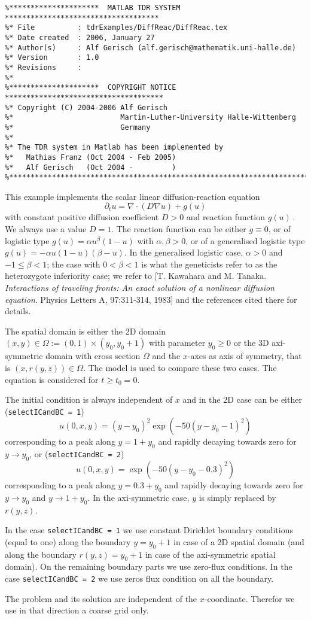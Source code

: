 \documentclass{article}
\begin{document}
\begin{verbatim}
%*********************  MATLAB TDR SYSTEM  ************************************
%* File          : tdrExamples/DiffReac/DiffReac.tex
%* Date created  : 2006, January 27
%* Author(s)     : Alf Gerisch (alf.gerisch@mathematik.uni-halle.de)
%* Version       : 1.0
%* Revisions     : 
%*
%*********************  COPYRIGHT NOTICE  *************************************
%* Copyright (C) 2004-2006 Alf Gerisch
%*                         Martin-Luther-University Halle-Wittenberg
%*                         Germany
%*
%* The TDR system in Matlab has been implemented by
%*   Mathias Franz (Oct 2004 - Feb 2005)
%*   Alf Gerisch   (Oct 2004 -         )
%******************************************************************************
\end{verbatim}


This example implements the scalar linear diffusion-reaction equation
\[
\partial_t u = \nabla\cdot(D \nabla u) + g(u)
\]
with constant positive diffusion coefficient $D>0$ and reaction function
$g(u)$\,.
We always use a value $D=1$.
The reaction function can be either $g\equiv 0$, or of logistic type
$g(u)=\alpha u^\beta (1-u)$ with $\alpha,\beta>0$,
or of a generalised logistic type $g(u)=-\alpha u (1-u)(\beta -u)$.
In the generalised logistic case, $\alpha>0$ and $-1\le \beta < 1$; the case
with $0< \beta < 1$ is what the geneticists refer to as the heterozygote
inferiority case; we refer to 
[T. Kawahara and M. Tanaka. \emph{Interactions of traveling fronts: An exact
  solution of a nonlinear diffusion equation}. Physics Letters A, 97:311-314,
1983] and the references cited there for details. 

The spatial domain is either the 2D domain $(x,y)\in\Omega:=(0,1)\times(y_0,
y_0+1)$ with parameter $y_0\ge 0$ or the 3D axi-symmetric domain with cross
section $\Omega$ and the $x$-axes as axis of symmetry, that is $(x,
r(y,z))\in\Omega$. The model is used to compare these two cases.
The equation is considered for $t\ge t_0=0$.

The initial condition is always independent of $x$ and in the 2D case can be
either (\texttt{selectICandBC = 1})
\[
u(0,x,y) = (y-y_0)^2 \exp( -50(y-y_0-1)^2 )
\]
corresponding to a peak along $y=1+y_0$ and rapidly decaying towards zero for
$y\to y_0$, or  (\texttt{selectICandBC = 2})
\[
u(0,x,y) = \exp( -50(y-y_0-0.3)^2)
\]
corresponding to a peak along $y=0.3+y_0$ and rapidly decaying towards zero
for $y\to y_0$ and $y\to 1+y_0$.
In the axi-symmetric case, $y$ is simply replaced by $r(y,z)$.


In the case \texttt{selectICandBC = 1} we use constant Dirichlet boundary
conditions (equal to one) along the boundary $y=y_0+1$ in case of a 2D spatial
domain (and along the boundary $r(y,z)=y_0+1$ in case of the axi-symmetric
spatial domain). On the remaining boundary parts we use zero-flux conditions.
In the case \texttt{selectICandBC = 2} we use zeros flux condition on all the
boundary. 


The problem and its solution are independent of the $x$-coordinate. Therefor
we use in that direction a coarse grid only.
\end{document}
